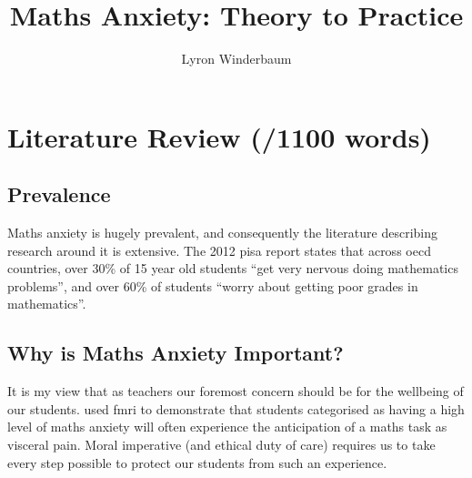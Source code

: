 \documentclass[14pt]{memoir}
\title{Maths Anxiety: Theory to Practice}
\author{Lyron Winderbaum}
\begin{document}
\maketitle



\begin{abstract}

\lipsum[1-2]

\end{abstract}


\glsresetall
\section{Literature Review (/1100 words)}

\subsection*{Prevalence}

Maths anxiety is hugely prevalent, and consequently the literature describing research around it is extensive. The  2012 \gls{pisa} report states that across \gls{oecd} countries, over 30\% of 15 year old students ``get very nervous doing mathematics problems'', and over 60\% of students ``worry about getting poor grades in mathematics''. 

\subsection*{Why is Maths Anxiety Important?}

It is my view that as teachers our foremost concern should be for the wellbeing of our students.  used \gls{fmri} to demonstrate that students categorised as having a high level of maths anxiety will often experience the anticipation of a maths task as visceral pain. Moral imperative (and ethical duty of care) requires us to take every step possible to protect our students from such an experience.
\end{document}
